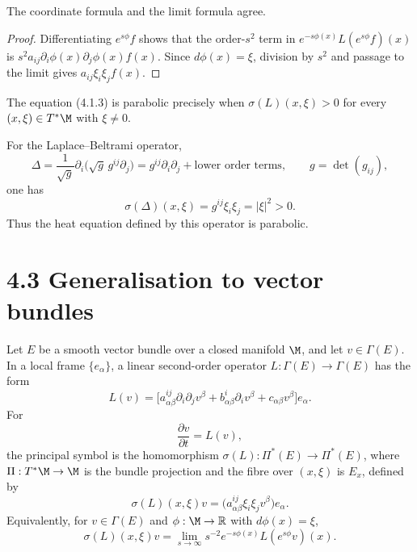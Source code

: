 \begin{remark}
\label{topping-pde-principal-symbol-limit-justification}

The coordinate formula and the limit formula agree.
\end{remark}
\begin{proof}
\sketch Differentiating $e^{s\phi}f$ shows that the order-$s^2$ term in
$e^{-s\phi(x)}L(e^{s\phi}f)(x)$ is
$s^2a_{ij}\partial_i\phi(x)\partial_j\phi(x)f(x)$. Since
$d\phi(x)=\xi$, division by $s^2$ and passage to the limit gives
$a_{ij}\xi_i\xi_jf(x)$.
\end{proof}

The equation (4.1.3) is parabolic precisely when
$\sigma(L)(x,\xi)>0$ for every $(x,\xi)\in T^*\M$ with $\xi\neq0$.

\begin{example}
\label{topping-pde-laplace-beltrami-example}

For the Laplace--Beltrami operator,
\[
\Delta=\frac{1}{\sqrt g}\partial_i\bigl(\sqrt g\,g^{ij}\partial_j\bigr)
 =g^{ij}\partial_i\partial_j+\text{lower order terms},
\qquad g=\det(g_{ij}),
\]
one has
\[
\sigma(\Delta)(x,\xi)=g^{ij}\xi_i\xi_j=\lvert\xi\rvert^2>0.
\]
Thus the heat equation defined by this operator is parabolic.
\end{example}

\section*{4.3 \quad Generalisation to vector bundles}

Let $E$ be a smooth vector bundle over a closed manifold $\M$, and let
$v\in\Gamma(E)$. In a local frame $\{e_\alpha\}$, a linear second-order operator
$L:\Gamma(E)\to\Gamma(E)$ has the form
\[
L(v)=\bigl[a^{ij}_{\alpha\beta}\partial_i\partial_jv^\beta
 +b^i_{\alpha\beta}\partial_iv^\beta+c_{\alpha\beta}v^\beta\bigr]e_\alpha.
\]
For
\[
\frac{\partial v}{\partial t}=L(v),
\tag{4.3.1}
\]
the principal symbol is the homomorphism
$\sigma(L):\Pi^*(E)\to\Pi^*(E)$, where $\Pi:T^*\M\to\M$ is the bundle
projection and the fibre over $(x,\xi)$ is $E_x$, defined by
\[
\sigma(L)(x,\xi)v
 =\bigl(a^{ij}_{\alpha\beta}\xi_i\xi_jv^\beta\bigr)e_\alpha.
\tag{4.3.2}
\]
Equivalently, for $v\in\Gamma(E)$ and $\phi:\M\to\mathbb R$ with
$d\phi(x)=\xi$,
\[
\sigma(L)(x,\xi)v
 =\lim_{s\to\infty}s^{-2}e^{-s\phi(x)}L(e^{s\phi}v)(x).
\tag{4.3.3}
\]

